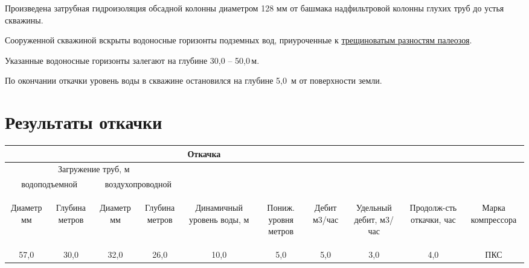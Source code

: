 \documentclass[a4paper,12pt]{article} %
\newcommand{\txtDepth}{50,0}						%
\newcommand{\txtDebit}{5,0}							%
\newcommand{\txtLevel}{5,0}							%
\newcommand{\txtGeology}{трещиноватым разностям палеозоя}
\begin{document}
\bigskip

Произведена затрубная гидроизоляция обсадной колонны диаметром 128 мм от башмака надфильтровой колонны глухих труб до устья скважины.

Сооруженной скважиной вскрыты водоносные горизонты  подземных вод, приуроченные к \underline{\txtGeology}.

Указанные водоносные горизонты залегают на глубине   30,0 – \txtDepth \,м.

По окончании откачки уровень воды в скважине остановился на глубине  \txtLevel \, м от поверхности земли.

\section*{Результаты откачки}

\begin{center}
\begin{tabular}{|c|c|c|c|c|c|c|c|c|c|}
	\hline 
	\multicolumn{8}{|c|}{Откачка}&  &  \\ 
	\hline 
	\multicolumn{4}{|c|}{Загружение труб, м}  &  &  &  &  &  &  \\ 
	\hline 
	\multicolumn{2}{|c|}{водоподъемной} & \multicolumn{2}{c|}{воздухопроводной} &  &  &  &  &  & \\ 
	\hline 
	\begin{sideways}Диаметр мм\end{sideways} &
	\begin{sideways}Глубина метров\end{sideways} &
	\begin{sideways}Диаметр мм\end{sideways} &
	\begin{sideways}Глубина метров\end{sideways} &
	\begin{sideways}Динамичный уровень воды, м\end{sideways} &
	\begin{sideways}Пониж. уровня метров\end{sideways} &
	\begin{sideways}Дебит м3/час\end{sideways} &
	\begin{sideways}Удельный дебит, м3/час\end{sideways} &
	\begin{sideways}Продолж-сть откачки, час\end{sideways} &
	\begin{sideways}Марка компрессора\end{sideways} \\ 
	\hline 
	57,0 & 30,0 & 32,0 & 26,0 & 10,0 & 5,0 & \txtDebit & 3,0 & 4,0 & ПКС \\ 
	\hline 
\end{tabular} 
\end{center}
\end{document}
